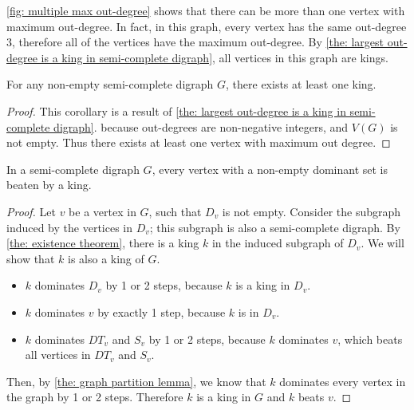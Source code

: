   \cref{fig: multiple max out-degree} shows that
  there can be more than one vertex with maximum out-degree.
  In fact, in this graph,
  every vertex has the same out-degree 3,
  therefore all of the vertices have the maximum out-degree.
  By \cref{the: largest out-degree is a king in semi-complete digraph},
  all vertices in this graph are kings.

  \begin{corollary}\label{the: existence theorem}
    For any non-empty semi-complete digraph \(G\),
    there exists at least one king.
  \end{corollary}

  \begin{proof}
    This corollary is a result of \cref{the: largest out-degree is a king in semi-complete digraph}.
    because out-degrees are non-negative integers,
    and \(V(G)\) is not empty.
    Thus there exists at least one vertex with maximum out degree.
  \end{proof}

  \begin{theorem}\label{the: beaten by king theorem}
    In a semi-complete digraph \(G\),
    every vertex with a non-empty dominant set
    is beaten by a king.
  \end{theorem}

  \begin{proof}
    Let \(v\) be a vertex in \(G\), such that \(D_v\) is not empty.
    Consider the subgraph induced by the vertices in \(D_v\);
    this subgraph is also a semi-complete digraph.
    By \cref{the: existence theorem},
    there is a king \(k\) in the induced subgraph of \(D_v\).
    We will show that \(k\) is also a king of \(G\).
    \begin{itemize}
      \item
        \(k\) dominates \(D_v\) by 1 or 2 steps,
        because \(k\) is a king in \(D_v\).
      \item
        \(k\) dominates \(v\) by exactly 1 step,
        because \(k\) is in \(D_v\).
      \item
        \(k\) dominates \(DT_v\) and \(S_v\) by 1 or 2 steps,
        because \(k\) dominates \(v\),
        which beats all vertices in \(DT_v\) and \(S_v\).
    \end{itemize}

    Then, by \cref{the: graph partition lemma},
    we know that \(k\) dominates
    every vertex in the graph by 1 or 2 steps.
    Therefore \(k\) is a king in \(G\) and \(k\) beats \(v\).
  \end{proof}

